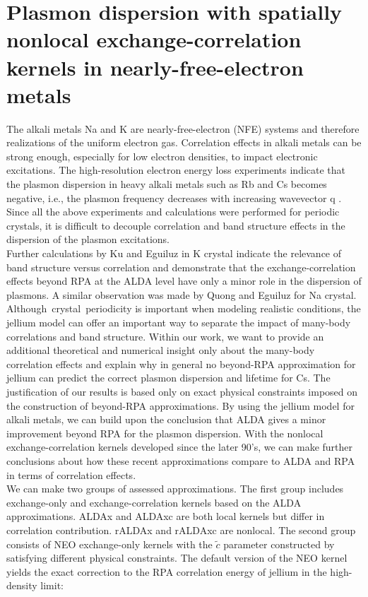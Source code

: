 \documentclass[aps,amsmath,amssymb, preprint, 12pt]{revtex4-1}
\begin{document}
\section{Plasmon dispersion with spatially nonlocal exchange-correlation kernels in nearly-free-electron metals}


The alkali metals Na and K are nearly-free-electron (NFE) systems and therefore realizations of the uniform electron gas. Correlation effects in alkali metals can be strong enough, especially for low electron densities, to impact electronic excitations. The high-resolution electron energy loss experiments indicate that the plasmon dispersion in heavy alkali metals such as Rb and Cs becomes negative, i.e., the plasmon frequency decreases with increasing wavevector q \cite{VSF89}. Since all the above experiments and calculations were performed for periodic crystals, it is difficult to decouple correlation and band structure effects \cite{STLS68} in the dispersion of the plasmon excitations.\\

Further calculations by Ku and Eguiluz in K crystal \cite{KE99} indicate the relevance of band structure versus correlation and demonstrate that the exchange-correlation effects beyond RPA at the ALDA level have only a minor role in the dispersion of plasmons. A similar observation was made by Quong and Eguiluz  \cite{QE93} for Na crystal. Although\ crystal\ periodicity is important when modeling realistic conditions, the jellium model can offer an important way to separate the impact of many-body correlations and band structure. Within our work, we want to provide an additional theoretical and numerical insight only about the many-body correlation effects and explain why in general no beyond-RPA approximation for jellium can predict the correct plasmon dispersion and lifetime for Cs. The justification of our results is based only on exact physical constraints imposed on the construction of beyond-RPA approximations.  By using the jellium model for alkali metals, we can build upon the conclusion that ALDA gives a minor improvement beyond RPA for the plasmon dispersion. With the nonlocal exchange-correlation kernels developed since  the later 90's, we can make further conclusions about how these recent approximations compare to ALDA and RPA in terms of correlation effects.\\

We can make two groups of assessed approximations. The first group includes exchange-only and exchange-correlation kernels based on the ALDA approximations. ALDAx and ALDAxc are both local kernels but differ in correlation contribution. rALDAx and rALDAxc are nonlocal. The second group consists of NEO exchange-only kernels \cite{BLR16} with the $\widetilde{c}$ parameter constructed by satisfying different physical constraints. The default version of the NEO kernel yields the exact correction to the RPA correlation energy of jellium in the high-density limit:
\end{document}
